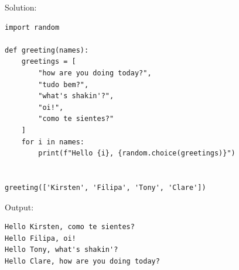 \documentclass[11pt]{article}
\begin{document}
Solution:
\begin{verbatim}
import random

def greeting(names):
    greetings = [
        "how are you doing today?",
        "tudo bem?",
        "what's shakin'?",
        "oi!",
        "como te sientes?"
    ]
    for i in names:
        print(f"Hello {i}, {random.choice(greetings)}")


greeting(['Kirsten', 'Filipa', 'Tony', 'Clare'])
\end{verbatim}

Output:
\begin{verbatim}
Hello Kirsten, como te sientes?
Hello Filipa, oi!
Hello Tony, what's shakin'?
Hello Clare, how are you doing today?
\end{verbatim}
\end{document}
